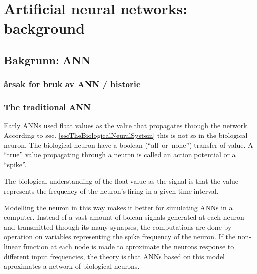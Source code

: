 % 			
% 			
% 			
% 			
% 			
%
%
%
%
%
%
%
\chapter{Artificial neural networks: background} %

\section{Bakgrunn: ANN}
	\subsection{årsak for bruk av ANN / historie}
	
	\subsection{The traditional ANN}
Early ANNs used float values as the value that propagates through the network. According to sec. \ref{secTheBiologicalNeuralSystem} this is not so in the biological neuron.
The biological neuron have a boolean (``all--or--none'') transfer of value. A ``true'' value propagating through a neuron is called an action potential or a ``spike''.

The biological understanding of the float value as the signal is that the value represents the frequency of the neuron's firing in a given time interval.

Modelling the neuron in this way makes it better for simulating ANNs in a computer. 
Instead of a vast amount of bolean signals generated at each neuron and transmitted through its many synapses, the computations are done by operation on variables representing the spike frequency of the neuron.
If the non-linear function at each node is made to aproximate the neurons response to different input frequencies, the theory is that ANNs based on this model aproximates a network of biological neurons.

